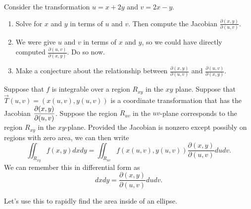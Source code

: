 \begin{problem}
Consider the transformation $u=x+2y$ and $v=2x-y$.  
\begin{enumerate}
 \item Solve for $x$ and $y$ in terms of $u$ and $v$. Then compute the Jacobian $\frac{\partial (x,y)}{\partial (u,v)}$.
 \item We were give $u$ and $v$ in terms of $x$ and $y$, so we could have directly computed $\frac{\partial (u,v)}{\partial (x,y)}$. Do so now.
 \item Make a conjecture about the relationship between $\frac{\partial (x,y)}{\partial (u,v)}$ and $\frac{\partial (u,v)}{\partial (x,y)}$. 
\end{enumerate}
\end{problem}

\begin{theorem}
 Suppose that $f$ is integrable over a region $R_{xy}$ in the $xy$ plane. Suppose that $\vec T(u,v)=(x(u,v),y(u,v))$ is a coordinate transformation that has the Jacobian $\displaystyle \frac{\partial (x,y)}{\partial (u,v)} $. Suppose the region $R_{uv}$ in the $uv$-plane corresponds to the region $R_{xy}$ in the $xy$-plane. Provided the Jacobian is nonzero except possibly on regions with zero area, we can then write  
$$\iint_{R_{xy}} f(x,y) dxdy = \iint_{R_{uv}} f(x(u,v),y(u,v)) \frac{\partial (x,y)}{\partial (u,v)} dudv.$$
 We can remember this in differential form as 
$$dxdy = \frac{\partial (x,y)}{\partial (u,v)} dudv.$$
\end{theorem}

Let's use this to rapidly find the area inside of an ellipse.

